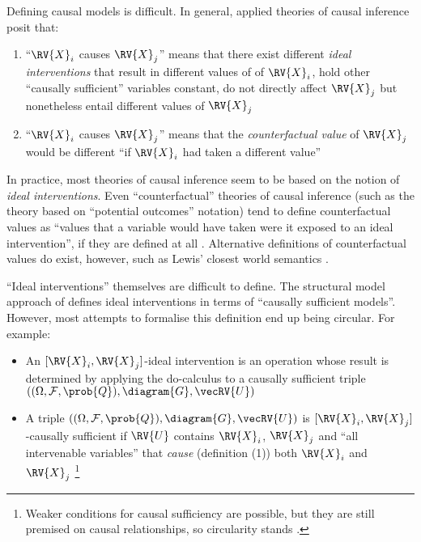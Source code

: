 Defining causal models is difficult. In general, applied theories of causal inference posit that:
\begin{enumerate}
    \item ``$\RV{X}_i$ causes $\RV{X}_j$'' means that there exist different \emph{ideal interventions} that result in different values of of $\RV{X}_i$, hold other ``causally sufficient'' variables constant, do not directly affect $\RV{X}_j$ but nonetheless entail different values of $\RV{X}_j$
    \item ``$\RV{X}_i$ causes $\RV{X}_j$'' means that the \emph{counterfactual value} of $\RV{X}_j$ would be different ``if $\RV{X}_i$ had taken a different value''
\end{enumerate}

In practice, most theories of causal inference seem to be based on the notion of \emph{ideal interventions}. Even ``counterfactual'' theories of causal inference (such as the theory based on ``potential outcomes'' notation) tend to define counterfactual values as ``values that a variable would have taken were it exposed to an ideal intervention'', if they are defined at all \citep{morgan_counterfactuals_2014,rubin_causal_2005,richardson2013single}. Alternative definitions of counterfactual values do exist, however, such as Lewis' closest world semantics \citep{lewis_causation_1986}.

``Ideal interventions'' themselves are difficult to define. The structural model approach of \citet{pearl_causality:_2009} defines ideal interventions in terms of ``causally sufficient models''. However, most attempts to formalise this definition end up being circular. For example:
\begin{itemize}
    \item An $[\RV{X}_i,\RV{X}_j]$-ideal intervention is an operation whose result is determined by applying the do-calculus to a causally sufficient triple $((\Omega,\mathcal{F},\prob{Q}),\diagram{G},\vecRV{U})$
    \item A triple $((\Omega,\mathcal{F},\prob{Q}),\diagram{G},\vecRV{U})$ is $[\RV{X}_i,\RV{X}_j]$-causally sufficient if $\RV{U}$ contains $\RV{X}_i$, $\RV{X}_j$ and ``all intervenable variables'' that \emph{cause} (definition (1)) both $\RV{X}_i$ and $\RV{X}_j$ \footnote{Weaker conditions for causal sufficiency are possible, but they are still premised on causal relationships, so circularity stands \citep{shpitser_complete_2008}.}
\end{itemize}

